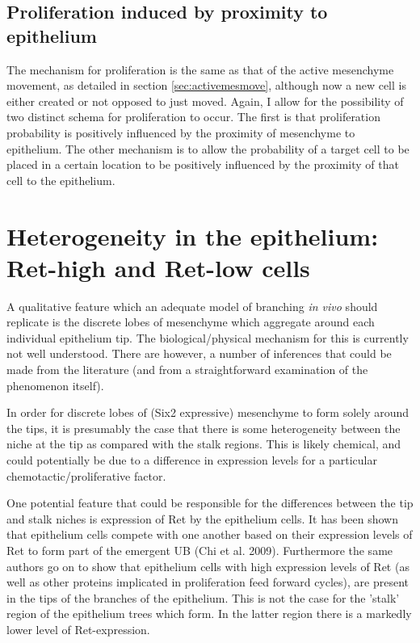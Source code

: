 \documentclass[pdftex,10pt,a4paper]{article}
\begin{document}
\subsection{Proliferation induced by proximity to epithelium}\label{sec:mesprolif}
The mechanism for proliferation is the same as that of the active mesenchyme movement, as detailed in section \ref{sec:activemesmove}, although now a new cell is either created or not opposed to just moved. Again, I allow for the possibility of two distinct schema for proliferation to occur. The first is that proliferation probability is positively influenced by the proximity of mesenchyme to epithelium. The other mechanism is to allow the probability of a target cell to be placed in a certain location to be positively influenced by the proximity of that cell to the epithelium.

\section{Heterogeneity in the epithelium: Ret-high and Ret-low cells}\label{sec:ret}
A qualitative feature which an adequate model of branching \textit{in vivo} should replicate is the discrete lobes of mesenchyme which aggregate around each individual epithelium tip. The biological/physical mechanism for this is currently not well understood. There are however, a number of inferences that could be made from the literature (and from a straightforward examination of the phenomenon itself). 

In order for discrete lobes of (Six2 expressive) mesenchyme to form solely around the tips, it is presumably the case that there is some heterogeneity between the niche at the tip as compared with the stalk regions. This is likely chemical, and could potentially be due to a difference in expression levels for a particular chemotactic/proliferative factor.

One potential feature that could be responsible for the differences between the tip and stalk niches is expression of Ret by the epithelium cells. It has been shown that epithelium cells compete with one another based on their expression levels of Ret to form part of the emergent UB (Chi et al. 2009). Furthermore the same authors go on to show that epithelium cells with high expression levels of Ret (as well as other proteins implicated in proliferation feed forward cycles), are present in the tips of the branches of the epithelium. This is not the case for the 'stalk' region of the epithelium trees which form. In the latter region there is a markedly lower level of Ret-expression. 
\end{document}
